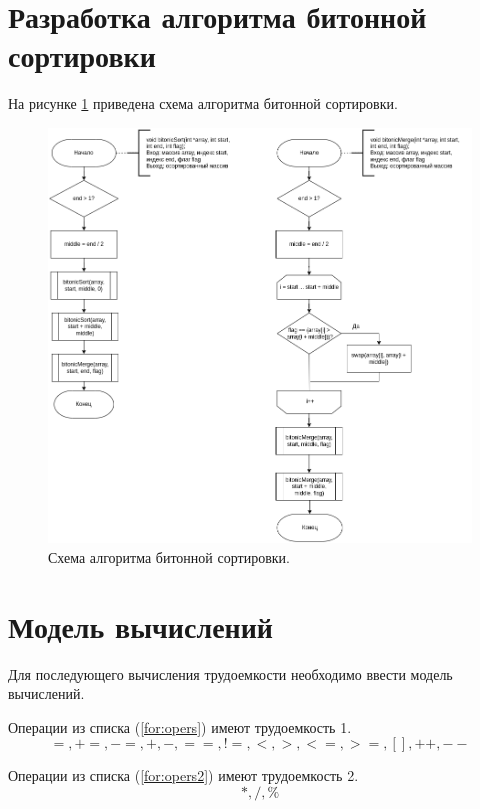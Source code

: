 \section{Разработка алгоритма битонной сортировки}
На рисунке \ref{img:bitonic} приведена схема алгоритма битонной сортировки.
\begin{figure}[h]
	\centering
	\includegraphics[width=175mm]{images/bitonic}
	\caption{Схема алгоритма битонной сортировки.}
	\label{img:bitonic}
\end{figure}

\section{Модель вычислений}

Для последующего вычисления трудоемкости необходимо ввести модель вычислений.

Операции из списка (\ref{for:opers}) имеют трудоемкость 1.
\begin{equation}
	\label{for:opers}
	=, +=, -=, +, -, ==, !=, <, >, <=, >=, [], ++, {-}-
\end{equation}

Операции из списка (\ref{for:opers2}) имеют трудоемкость 2.
\begin{equation}
	\label{for:opers2}
	*, /, \%
\end{equation}

